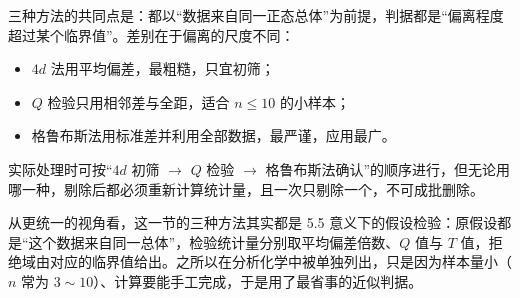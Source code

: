 \documentclass[UTF8]{ctexbook}
\begin{document}
三种方法的共同点是：都以“数据来自同一正态总体”为前提，判据都是“偏离程度超过某个临界值”。差别在于偏离的尺度不同：
\begin{itemize}
  \item $4d$ 法用平均偏差，最粗糙，只宜初筛；
  \item $Q$ 检验只用相邻差与全距，适合 $n\le 10$ 的小样本；
  \item 格鲁布斯法用标准差并利用全部数据，最严谨，应用最广。
\end{itemize}
实际处理时可按“$4d$ 初筛 $\to$ $Q$ 检验 $\to$ 格鲁布斯法确认”的顺序进行，但无论用哪一种，剔除后都必须重新计算统计量，且一次只剔除一个，不可成批删除。

从更统一的视角看，这一节的三种方法其实都是 5.5 意义下的假设检验：原假设都是“这个数据来自同一总体”，检验统计量分别取平均偏差倍数、$Q$ 值与 $T$ 值，拒绝域由对应的临界值给出。之所以在分析化学中被单独列出，只是因为样本量小（$n$ 常为 $3\sim 10$）、计算要能手工完成，于是用了最省事的近似判据。
\end{document}

